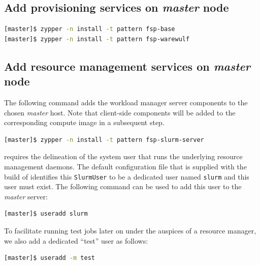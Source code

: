 \documentclass[letterpaper]{article}
\begin{document}
\subsection{Add provisioning services on {\em master} node}


\begin{lstlisting}[language=bash,keywords={}]
[master]$ zypper -n install -t pattern fsp-base      
[master]$ zypper -n install -t pattern fsp-warewulf
\end{lstlisting}

\subsection{Add resource management services on {\em master} node} \label{sec:add_rm}

The following command adds the \SLURM{} workload manager server components to the
chosen {\em master} host. Note that client-side components will be added to
the corresponding compute image in a subsequent step.

\begin{lstlisting}[language=bash,keywords={}]
[master]$ zypper -n install -t pattern fsp-slurm-server
\end{lstlisting}

\SLURM{} requires the delineation of the system user that runs the underlying
resource management daemons. The default configuration file that is supplied
with the \FSP{} build of \SLURM{} identifies this \texttt{SlurmUser} to be a
dedicated user named \texttt{slurm} and this user must exist. 
The following command can be used to add this user to the {\em
  master} server:

\begin{lstlisting}[language=bash,keywords={}]
[master]$ useradd slurm
\end{lstlisting}

To facilitate running test jobs later on under the auspices of a resource
manager, we also add a dedicated ``test'' user as follows:

\begin{lstlisting}[language=bash,keywords={}]
[master]$ useradd -m test
\end{lstlisting}
\end{document}
